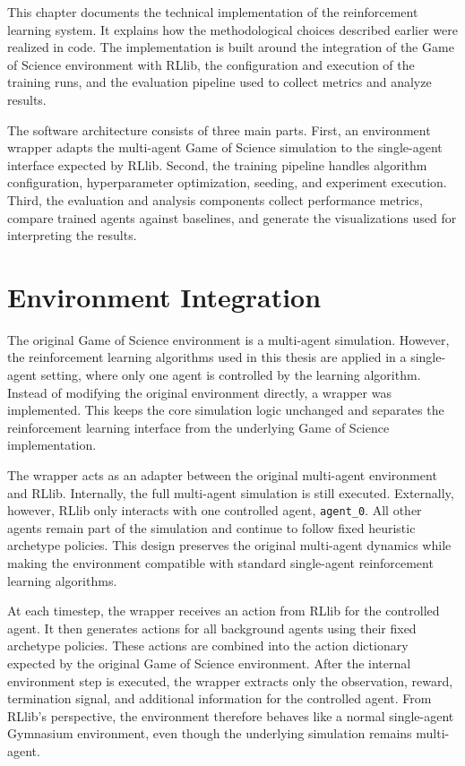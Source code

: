 \documentclass[english,bachelor]{hsluthesis}
\begin{document}
This chapter documents the technical implementation of the reinforcement learning system. It explains how the methodological choices described earlier were realized in code. The implementation is built around the integration of the Game of Science environment with RLlib, the configuration and execution of the training runs, and the evaluation pipeline used to collect metrics and analyze results.

The software architecture consists of three main parts. First, an environment wrapper adapts the multi-agent Game of Science simulation to the single-agent interface expected by RLlib. Second, the training pipeline handles algorithm configuration, hyperparameter optimization, seeding, and experiment execution. Third, the evaluation and analysis components collect performance metrics, compare trained agents against baselines, and generate the visualizations used for interpreting the results.

\section{Environment Integration}

The original Game of Science environment is a multi-agent simulation. However, the reinforcement learning algorithms used in this thesis are applied in a single-agent setting, where only one agent is controlled by the learning algorithm. Instead of modifying the original environment directly, a wrapper was implemented. This keeps the core simulation logic unchanged and separates the reinforcement learning interface from the underlying Game of Science implementation.

The wrapper acts as an adapter between the original multi-agent environment and RLlib. Internally, the full multi-agent simulation is still executed. Externally, however, RLlib only interacts with one controlled agent, \texttt{agent\_0}. All other agents remain part of the simulation and continue to follow fixed heuristic archetype policies. This design preserves the original multi-agent dynamics while making the environment compatible with standard single-agent reinforcement learning algorithms.

At each timestep, the wrapper receives an action from RLlib for the controlled agent. It then generates actions for all background agents using their fixed archetype policies. These actions are combined into the action dictionary expected by the original Game of Science environment. After the internal environment step is executed, the wrapper extracts only the observation, reward, termination signal, and additional information for the controlled agent. From RLlib's perspective, the environment therefore behaves like a normal single-agent Gymnasium environment, even though the underlying simulation remains multi-agent.
\end{document}

